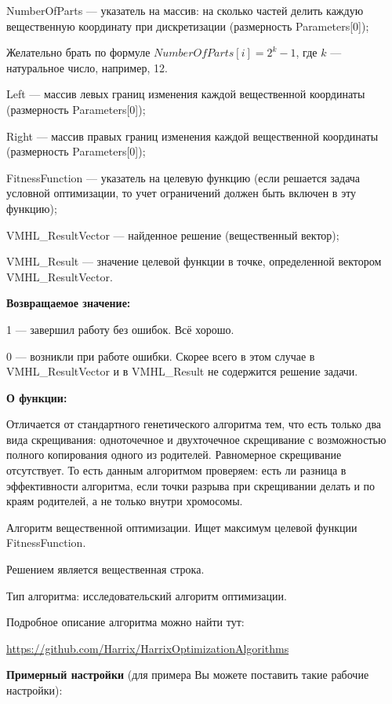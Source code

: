 \documentclass[a4paper,12pt]{article}
\begin{document}
 NumberOfParts --- указатель на массив: на сколько частей делить каждую вещественную координату при дискретизации (размерность Parameters[0]);
 
  Желательно брать по формуле $NumberOfParts[i]=2^k-1$, где $k$ --- натуральное число, например, 12.
  
 Left --- массив левых границ изменения каждой вещественной координаты (размерность Parameters[0]);
 
 Right --- массив правых границ изменения каждой вещественной координаты (размерность Parameters[0]);
 
 FitnessFunction --- указатель на целевую функцию (если решается задача условной оптимизации, то учет ограничений должен быть включен в эту функцию);
 
 VMHL\_ResultVector --- найденное решение (вещественный вектор);
 
 VMHL\_Result --- значение целевой функции в точке, определенной вектором VMHL\_ResultVector.

\textbf{Возвращаемое значение:} 

 1 --- завершил работу без ошибок. Всё хорошо.
 
 0 --- возникли при работе ошибки. Скорее всего в этом случае в VMHL\_ResultVector и в VMHL\_Result не содержится решение задачи.

\textbf{О функции:}

Отличается от стандартного генетического алгоритма тем, что есть только два вида скрещивания: одноточечное и двухточечное скрещивание с возможностью полного копирования одного из родителей. Равномерное скрещивание отсутствует. То есть данным алгоритмом проверяем: есть ли разница в эффективности алгоритма, если точки разрыва при скрещивании делать и по краям родителей, а не только внутри хромосомы.

Алгоритм вещественной оптимизации. Ищет максимум целевой функции FitnessFunction.

Решением является вещественная строка.

Тип алгоритма: исследовательский алгоритм оптимизации.

Подробное описание алгоритма можно найти тут:

\href{https://github.com/Harrix/HarrixOptimizationAlgorithms/blob/master/\_HarrixOptimizationAlgorithms.pdf}{https://github.com/Harrix/HarrixOptimizationAlgorithms}

\textbf{Примерный настройки} (для примера Вы можете поставить такие рабочие настройки):
\end{document}

